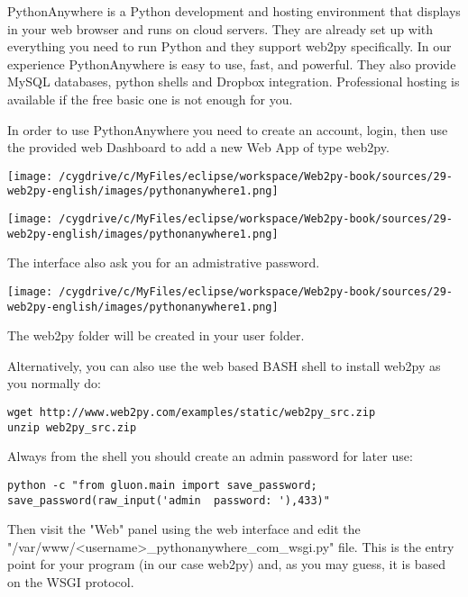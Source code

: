 \documentclass[justified,sixbynine,notoc]{tufte-book}
\begin{document}
\begin{fullwidth}
PythonAnywhere is a Python development and hosting environment that displays in your web browser and runs on cloud servers. They are already set up with everything you need to run Python
and they support web2py specifically. In our experience PythonAnywhere is easy to use, fast, and powerful. They also provide MySQL databases, python shells and Dropbox integration.
Professional hosting is available if the free basic one is not enough for you.

In order to use PythonAnywhere you need to create an account, login, then use the provided web Dashboard to add a new Web App of type web2py.


\goodbreak\begin{center}\texttt{[image: /cygdrive/c/MyFiles/eclipse/workspace/Web2py-book/sources/29-web2py-english/images/pythonanywhere1.png]}\end{center}


\goodbreak\begin{center}\texttt{[image: /cygdrive/c/MyFiles/eclipse/workspace/Web2py-book/sources/29-web2py-english/images/pythonanywhere1.png]}\end{center}


The interface also ask you for an admistrative password.


\goodbreak\begin{center}\texttt{[image: /cygdrive/c/MyFiles/eclipse/workspace/Web2py-book/sources/29-web2py-english/images/pythonanywhere1.png]}\end{center}


The web2py folder will be created in your user folder.

Alternatively, you can also use the web based BASH shell to install web2py as you normally do:

\begin{lstlisting}
wget http://www.web2py.com/examples/static/web2py_src.zip
unzip web2py_src.zip
\end{lstlisting}

Always from the shell you should create an admin password for later use:

\begin{lstlisting}
python -c "from gluon.main import save_password; save_password(raw_input('admin  password: '),433)"
\end{lstlisting}

Then visit the "Web" panel using the web interface and edit the "/var/www/<username>\_pythonanywhere\_com\_wsgi.py" file. This is the entry point for your program (in our case web2py) and, as you may guess, it is based on the WSGI protocol.


\end{fullwidth}
\end{document}
